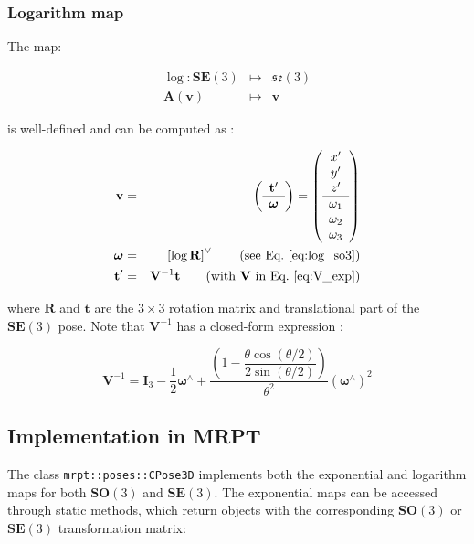 \documentclass[a4paper,11pt]{report}
\newcommand{\W}{{\bm{\omega}}}
\newcommand{\hatop}[1]{#1^\wedge}
\begin{document}
\subsubsection{Logarithm map}

The map:

\begin{eqnarray}
  \log: \mathbf{SE}(3) &\mapsto& \mathfrak{se}(3) \\
  \mathbf{A}(\mathbf{v})  & \mapsto & \mathbf{v}
\nonumber
\end{eqnarray}

\noindent is well-defined and can be computed as \cite{wang2008nps}:

\begin{eqnarray}
\label{eq:rodrigues_ln_se3}
\mathbf{v} &=&
\left(
\begin{array}{c}
 \mathbf{t}' \\ \hline \W
\end{array}
\right)
=
\left(
\begin{array}{c}
 x'\\y'\\z' \\ \hline \omega_1 \\ \omega_2 \\ \omega_3
\end{array}
\right)
\nonumber \\
\W &=& \left[ \log \mathbf{R} \right]^\vee  \quad \quad \text{(see Eq.~\ref{eq:log_so3})}
\\
\mathbf{t}' &=& \mathbf{V}^{-1} \mathbf{t} \quad \quad \text{(with $\mathbf{V}$ in Eq.~\ref{eq:V_exp})}
\end{eqnarray}

\noindent where $\mathbf{R}$ and $\mathbf{t}$ are the $3 \times 3$ rotation matrix
and translational part of the $\mathbf{SE}(3)$ pose.
Note that $\mathbf{V}^{-1}$ has a closed-form expression \cite{gallier2003computing}:

\begin{equation}
\mathbf{V}^{-1} = \mathbf{I}_3 
- \dfrac{1}{2} \hatop{\W} + 
\dfrac{\left(
 1 - \dfrac{ \theta \cos(\theta/2)}{2 \sin(\theta / 2)}
\right) 
}{\theta^2}  (\hatop{\W})^2
\end{equation}


\subsection{Implementation in MRPT}

The class \texttt{mrpt::poses::CPose3D} implements both the exponential and logarithm
maps for both $\mathbf{SO}(3)$ and $\mathbf{SE}(3)$.
The exponential maps can be accessed through static methods, which return objects
with the corresponding $\mathbf{SO}(3)$ or $\mathbf{SE}(3)$ transformation matrix:
\end{document}
